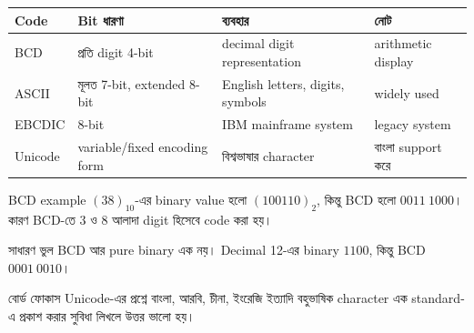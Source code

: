 \begin{center}
\begin{tabular}{|p{}|p{}|p{}|p{}|}
\hline
\textbf{Code} & \textbf{Bit ধারণা} & \textbf{ব্যবহার} & \textbf{নোট} \\
\hline
BCD & প্রতি digit 4-bit & decimal digit representation & arithmetic display \\
\hline
ASCII & মূলত 7-bit, extended 8-bit & English letters, digits, symbols & widely used \\
\hline
EBCDIC & 8-bit & IBM mainframe system & legacy system \\
\hline
Unicode & variable/fixed encoding form & বিশ্বভাষার character & বাংলা support করে \\
\hline
\end{tabular}
\end{center}

\begin{examplebox}{BCD example}
$(38)_{10}$-এর binary value হলো $(100110)_2$, কিন্তু BCD হলো $0011\ 1000$। কারণ BCD-তে 3 ও 8 আলাদা digit হিসেবে code করা হয়।
\end{examplebox}

\begin{mistakebox}{সাধারণ ভুল}
BCD আর pure binary এক নয়। Decimal 12-এর binary $1100$, কিন্তু BCD $0001\ 0010$।
\end{mistakebox}

\begin{boardbox}{বোর্ড ফোকাস}
Unicode-এর প্রশ্নে বাংলা, আরবি, চীনা, ইংরেজি ইত্যাদি বহুভাষিক character এক standard-এ প্রকাশ করার সুবিধা লিখলে উত্তর ভালো হয়।
\end{boardbox}

